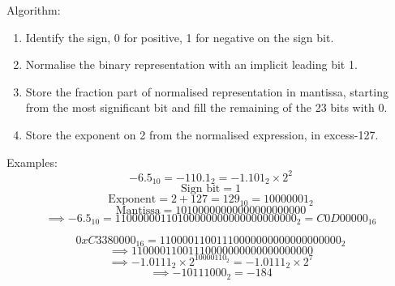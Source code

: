 \documentclass[12pt]{article} %
\begin{document}
Algorithm:
\begin{enumerate}
    \item Identify the sign, 0 for positive, 1 for negative on the sign bit.
    \item Normalise the binary representation with an implicit leading bit 1.
    \item Store the fraction part of normalised representation in mantissa, starting from the most significant bit and fill the remaining of the 23 bits with 0.
    \item Store the exponent on 2 from the normalised expression, in excess-127.
\end{enumerate}

Examples:
\[-6.5_{10} = -110.1_{2} = -1.101_2 \times 2^2\]
\[\text{Sign bit} = 1\]
\[\text{Exponent} = 2 + 127 = 129_{10} = 10000001_2\]
\[\text{Mantissa} = 101 0000 0000 0000 0000 0000\]
\[\implies -6.5_{10} = 1 10000001 10100000000000000000000_{2} = C0D00000_{16}\]


\[0xC3380000_{16} = 1100 0011 0011 1000 0000 0000 0000 0000_{2}\]
\[\implies 1 10000110 01110000000000000000000\]
\[\implies -1.0111_{2} \times 2^{10000110_{2}} = -1.0111_{2} \times 2^{7}\]
\[\implies -10111000_2 = -184\]
\end{document}
